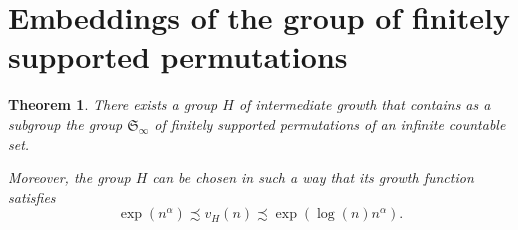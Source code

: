 \documentclass{amsart}
\newcommand\Grig{{G_{012}}}
\newtheorem{theorem}[lemma]{Theorem}
\theoremstyle{definition}
\begin{document}
\section{Embeddings of the group of finitely supported permutations}


\begin{theorem}\label{thm:embedSinfty}
  There exists a group $H$ of intermediate growth that contains as a
  subgroup the group $\mathfrak S_\infty$ of finitely supported
  permutations of an infinite countable set.

  Moreover, the group $H$ can be chosen in such a way that its growth
  function satisfies
  \[\exp(n^\alpha)\precsim v_H(n)\precsim\exp(\log(n)n^\alpha).\]
\end{theorem}
\end{document}
